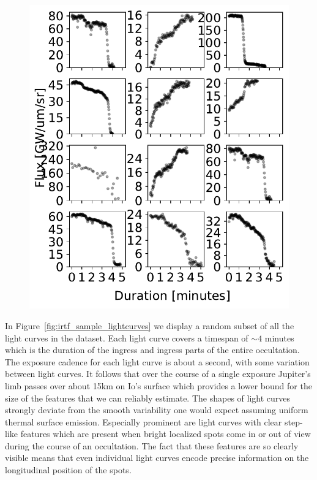 \documentclass[modern]{aastex62}
\begin{document}
\begin{figure}[h!]
    \begin{centering}
        \includegraphics[width=\linewidth]{figures/irtf_sample_lightcurves.pdf}
    \end{centering}
\end{figure}

In Figure~\ref{fig:irtf_sample_lightcurves} we display a random subset of all the light curves
in the dataset. 
Each light curve covers a timespan of $\sim 4$ minutes which is the duration of the ingress and ingress parts of the entire occultation.
The exposure cadence for each light curve is about a second, with some variation between light curves.
It follows that over the course of a single exposure Jupiter's limb passes over about 15km on Io's surface which provides a lower bound for the size of the features that we can reliably estimate.
The shapes of light curves strongly deviate from the smooth variability one would expect assuming uniform thermal surface emission.
Especially prominent are light curves with clear step-like features which are present when bright localized spots come in or out of view during the course of an occultation.
The fact that these features are so clearly visible means that even individual light curves encode precise information on the longitudinal position of the spots.
\end{document}
